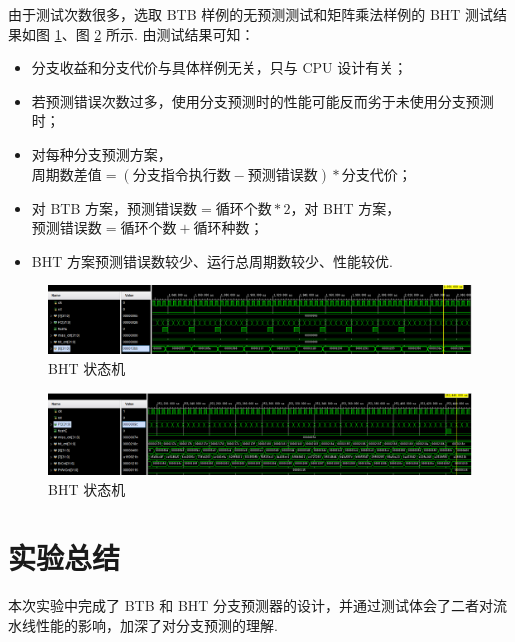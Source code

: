 \documentclass[UTF8]{ctexart}
\begin{document}
由于测试次数很多，选取 BTB 样例的无预测测试和矩阵乘法样例的 BHT 测试结果如图 \ref{t2}、图 \ref{t3} 所示. 由测试结果可知：

\begin{itemize} 
    \item 分支收益和分支代价与具体样例无关，只与 CPU 设计有关；
    \item 若预测错误次数过多，使用分支预测时的性能可能反而劣于未使用分支预测时；
    \item 对每种分支预测方案，$\mbox{周期数差值}=(\mbox{分支指令执行数}-\mbox{预测错误数})*\mbox{分支代价}$；
    \item 对 BTB 方案，$\mbox{预测错误数}=\mbox{循环个数}*2$，对 BHT 方案，$\mbox{预测错误数}=\mbox{循环个数}+\mbox{循环种数}$；
    \item BHT 方案预测错误数较少、运行总周期数较少、性能较优.
\end{itemize}

\begin{figure}[htbp]
\centering
\includegraphics[width = .85\textwidth]{2.png}
\caption{BHT 状态机}
\label{t2}
\end{figure}

\begin{figure}[htbp]
\centering
\includegraphics[width = .85\textwidth]{3.png}
\caption{BHT 状态机}
\label{t3}
\end{figure}

\section{实验总结}

本次实验中完成了 BTB 和 BHT 分支预测器的设计，并通过测试体会了二者对流水线性能的影响，加深了对分支预测的理解.
\end{document}
